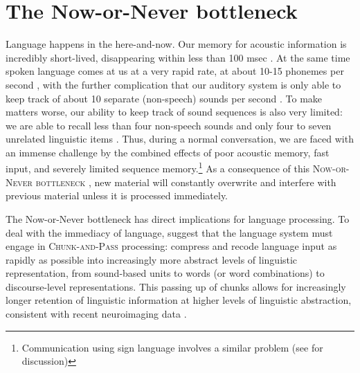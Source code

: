 \documentclass[output=paper]{langsci/langscibook}
\begin{document}
\section{The Now-or-Never bottleneck}
  
Language happens in the here-and-now. Our memory for acoustic information is incredibly short-lived, disappearing within less than 100 msec \citep{Remez2010}. At the same time spoken language comes at us at a very rapid rate, at about 10-15 phonemes per second \citep{Studdert-Kennedy1986}, with the further complication that our auditory system is only able to keep track of about 10 separate (non-speech) sounds per second \citep{Miller1948}. To make matters worse, our ability to keep track of sound sequences is also very limited: we are able to recall less than four non-speech sounds \citep{Warren1969} and only four to seven unrelated linguistic items \citep{Cowan2000,Miller1956}. Thus, during a normal conversation, we are faced with an immense challenge by the combined effects of poor acoustic memory, fast input, and severely limited sequence memory.\footnote{ Communication using sign language involves a similar problem (see \citealt{ChristiansenInPress} for discussion)} As a consequence of this \textsc{Now-or-Never bottleneck } \citep{ChristiansenInPress}, new material will constantly overwrite and interfere with previous material unless it is processed immediately.
 
\largerpage[-2] 
The Now-or-Never bottleneck has direct implications for language processing. To deal with the immediacy of language, \citet{ChristiansenInPress} suggest that the language system must engage in \textsc{Chunk-and-Pass} processing: compress and recode language input as rapidly as possible into increasingly more abstract levels of linguistic representation, from sound-based units to words (or word combinations) to discourse-level representations. This passing up of chunks allows for increasingly longer retention of linguistic information at higher levels of linguistic abstraction, consistent with recent neuroimaging data \citep[e.g.,][]{Ding2016,Stephens2013}.
\end{document}
